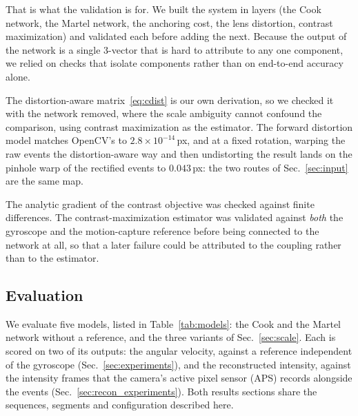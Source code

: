 \documentclass[journal]{IEEEtran}
\begin{document}
That is what the validation is for. We built the system in layers (the Cook network, the Martel network, the anchoring cost, the lens distortion, contrast maximization) and validated each before adding the next. Because the output of the network is a single 3-vector that is hard to attribute to any one component, we relied on checks that isolate components rather than on end-to-end accuracy alone. 

The distortion-aware matrix~\eqref{eq:cdist} is our own derivation, so we checked it with the network removed, where the scale ambiguity cannot confound the comparison, using contrast maximization as the estimator. The forward distortion model matches OpenCV's to $2.8\times10^{-14}$\,px, and at a fixed rotation, warping the raw events the distortion-aware way and then undistorting the result lands on the pinhole warp of the rectified events to $0.043$\,px: the two routes of Sec.~\ref{sec:input} are the same map. 

The analytic gradient of the contrast objective was checked against finite differences. The contrast-maximization estimator was validated against \emph{both} the gyroscope and the motion-capture reference before being connected to the network at all, so that a later failure could be attributed to the coupling rather than to the estimator.

\subsection{Evaluation}
\label{sec:protocol}

We evaluate five models, listed in Table~\ref{tab:models}: the Cook and the
Martel network without a reference, and the three variants of
Sec.~\ref{sec:scale}. Each is scored on two of its outputs: the angular velocity, against a reference independent of the gyroscope (Sec.~\ref{sec:experiments}), and the reconstructed intensity, against the intensity frames that the camera's active pixel sensor (APS) records alongside the events (Sec.~\ref{sec:recon_experiments}). Both
results sections share the sequences, segments and configuration described
here.
\end{document}
